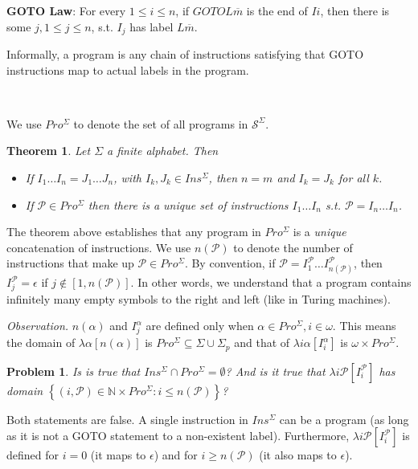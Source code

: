 \documentclass[a4paper, 12pt]{article}
\newtheorem{problem}{Problem}
\newtheorem{theorem}{Theorem}
\newtheorem{problem}{Problem}
\newtheorem{theorem}{Theorem}
\begin{document}
\textbf{GOTO Law}: For every $1 \leq i \leq n$, if $GOTOL \overline{m}$ is
the end of $Ii$, then there is some $j, 1 \leq j \leq n$, s.t. $I_j$ has label
$L \overline{m}$.

Informally, a program is any chain of instructions satisfying that GOTO
instructions map to actual labels in the program.

~ 

We use $Pro^{\Sigma}$ to denote the set of all programs in
$\mathcal{S}^{\Sigma}$.

\begin{theorem}
    Let $\Sigma$ a finite alphabet. Then 

    \begin{itemize}
        \item If $I_1 \ldots I_n = J_1 \ldots J_n$, with $I_k, J_k \in
            Ins^{\Sigma}$, then $n = m$ and $I_k = J_k$ for all $k$.
        \item If $\mathcal{P} \in Pro^{\Sigma}$ then there is a unique set of
            instructions $I_1 \ldots I_n$ s.t. $\mathcal{P} = I_n \ldots I_n$.
    \end{itemize}
\end{theorem}

The theorem above establishes that any program in $Pro^{\Sigma}$ is a
\textit{unique} concatenation of instructions. We use $n(\mathcal{P})$ to denote
the number of instructions that make up $\mathcal{P} \in Pro^{\Sigma}$. By
convention, if $\mathcal{P} = I^{\mathcal{P}}_1 \ldots
I^{\mathcal{P}}_{n(\mathcal{P})}$, then $I^{\mathcal{P}}_j =
\epsilon$ if $j \not\in [1, n(\mathcal{P})]$. In other words, we understand that
a program contains infinitely many empty symbols to the right and left (like in
Turing machines).

\textit{Observation.} $n(\alpha)$ and $I_j^{\alpha}$ are defined only when
$\alpha \in Pro^{\Sigma}, i \in \omega$. This means the domain of $\lambda
\alpha[n(\alpha)]$ is $Pro^{\Sigma} \subseteq \Sigma \cup \Sigma_p$ and that of
$\lambda i\alpha[I_i^{\alpha}]$ is $\omega \times Pro^{\Sigma}$.

\begin{problem}
    Is is true that $Ins^{\Sigma} \cap Pro^{\Sigma} = \emptyset$? And is it true
    that $\lambda i \mathcal{P} [I_i^{\mathcal{P}}]$ has domain $\left\{ (i,
    \mathcal{P}) \in \mathbb{N} \times Pro^{\Sigma}: i \leq n(\mathcal{P})
\right\} $?
\end{problem}

Both statements are false. A single instruction in $Ins^{\Sigma}$ can be a
program (as long as it is not a GOTO statement to a non-existent label).
Furthermore, $\lambda i \mathcal{P} [I_i^{\mathcal{P}}]$ is defined for $i = 0$
(it maps to $\epsilon$) and for $i \geq n(\mathcal{P} )$ (it also maps to
$\epsilon$).
\end{document}
